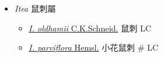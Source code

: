 
  \begin{itemize}
 \item[] \textit{Itea} 鼠刺屬
                                
  \begin{itemize}
        \item[] \href{http://www.theplantlist.org/tpl1.1/search?q=Itea+oldhamii}{\textit{I. oldhamii} C.K.Schneid.}   鼠刺   LC
        \item[] \href{http://www.theplantlist.org/tpl1.1/search?q=Itea+parviflora}{\textit{I. parviflora} Hemsl.}   小花鼠刺  \# LC
  \end{itemize}
  \end{itemize}
